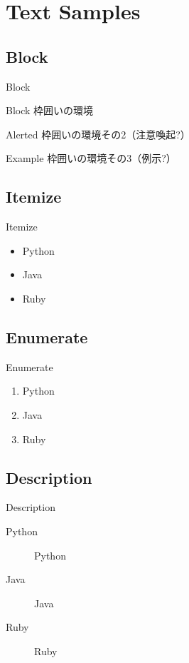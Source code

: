 \section{Text Samples}

\subsection{Block}
\begin{frame}{Block}
    \begin{block}{Block}
      枠囲いの環境
    \end{block}
    \begin{alertblock}{Alerted}
      枠囲いの環境その2（注意喚起?）
    \end{alertblock}
    \begin{exampleblock}{Example}
      枠囲いの環境その3（例示?）
    \end{exampleblock}
\end{frame}

\subsection{Itemize}
\begin{frame}{Itemize}
  \begin{itemize}
    \item Python
    \item Java
    \item Ruby
  \end{itemize}
\end{frame}

\subsection{Enumerate}
\begin{frame}{Enumerate}
  \begin{enumerate}
    \item Python
    \item Java
    \item Ruby
  \end{enumerate}
\end{frame}

\subsection{Description}
\begin{frame}{Description}
  \begin{description}
    \item[Python] Python
    \item[Java]   Java
    \item[Ruby]   Ruby
  \end{description}
\end{frame}

